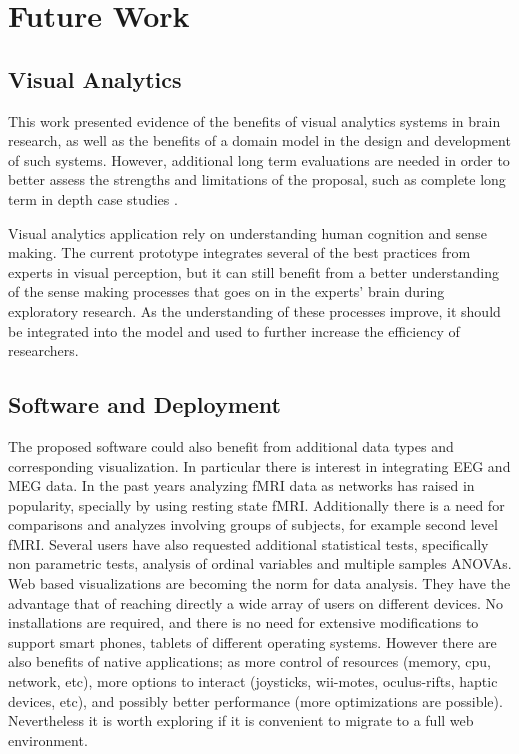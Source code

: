 {\section{Future Work}

\subsection{Visual Analytics}
This work presented evidence of the benefits of visual analytics systems in brain research, as well as the benefits of a domain model in the design and development of such systems. However, additional long term evaluations are needed in order to better assess the strengths and limitations of the proposal, such as complete long term in depth case studies \autocite{shneiderman_strategies_2006}. 

Visual analytics application rely on understanding human cognition and sense making. The current prototype integrates several of the best practices from experts in visual perception, but it can still benefit from a better understanding of the sense making processes that goes on in the experts' brain during exploratory research. As the understanding of these processes improve, it should be integrated into the model and used to further increase the efficiency of researchers.


\subsection{Software and Deployment}

The proposed software could also benefit from additional data types and corresponding visualization. In particular there is interest in integrating EEG and MEG data. In the past years analyzing fMRI data as networks has raised in popularity, specially by using resting state fMRI. Additionally there is a need for comparisons and analyzes involving groups of subjects, for example second level fMRI. Several users have also requested additional statistical tests, specifically non parametric tests, analysis of ordinal variables and multiple samples ANOVAs.  
Web based visualizations are becoming the norm for data analysis. They have the advantage that of reaching directly a wide array of users on different devices. No installations are required, and there is no need for extensive modifications to support smart phones, tablets of different operating systems. However there are also benefits of native applications; as more control of resources (memory, cpu, network, etc), more options to interact (joysticks, wii-motes, oculus-rifts, haptic devices, etc), and possibly better performance (more optimizations are possible). Nevertheless it is worth exploring if it is convenient to migrate to a full web environment.

}
